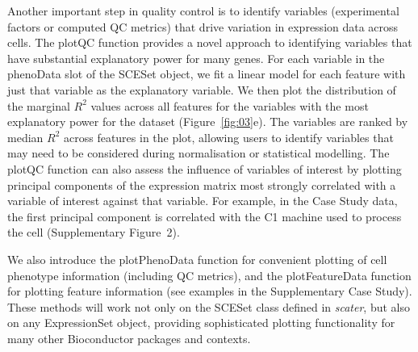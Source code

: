 \documentclass{bioinfo}
\begin{document}
Another important step in quality control is to identify variables (experimental factors or computed QC metrics) that drive variation in expression data across cells. The plotQC function
provides a novel approach to identifying variables that
have substantial explanatory power for many genes. For each variable in
the phenoData slot of the SCESet object, we fit a linear model for each
feature with just that variable as the explanatory variable. We then plot the distribution of the marginal $R^2$ values across all features for the variables with the most
explanatory power for the dataset (Figure~\ref{fig:03}e). The variables are ranked by median $R^2$ across features in the plot, allowing users to identify variables that may need to be considered
during normalisation or statistical modelling. The plotQC function can
also assess the influence of variables of interest by plotting principal
components of the expression matrix most strongly correlated with a
variable of interest against that variable. For example, in the Case
Study data, the first principal component is correlated with the
C1 machine used to process the cell (Supplementary Figure~2).

We also introduce the plotPhenoData function for convenient plotting of
cell phenotype information (including QC metrics), and the
plotFeatureData function for plotting feature information (see examples in the
Supplementary Case Study). These methods will work not only on the
SCESet class defined in \emph{scater}, but also on any ExpressionSet object,
providing sophisticated plotting functionality for many other Bioconductor
packages and contexts.
\end{document}
